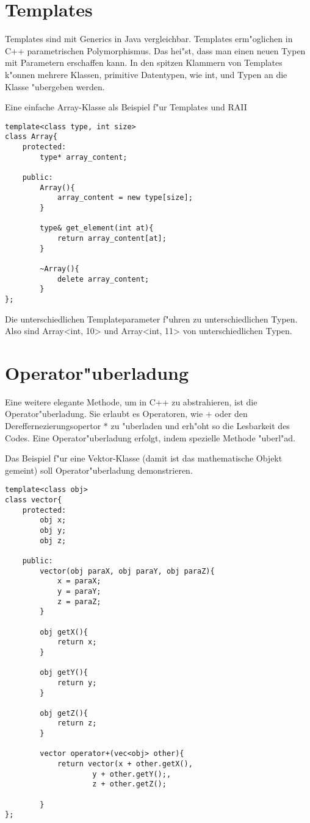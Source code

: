 \documentclass[14pt, a4paper]{report}
\begin{document}
\section{Templates}
Templates sind mit Generics in Java vergleichbar. Templates erm"oglichen in C++
parametrischen Polymorphismus. Das hei"st, dass man einen neuen Typen mit Parametern
erschaffen kann. In den spitzen Klammern von Templates k"onnen mehrere Klassen, 
primitive Datentypen, wie int, und Typen an die Klasse "ubergeben werden.

Eine einfache Array-Klasse als Beispiel f"ur Templates und RAII
\begin{lstlisting}
template<class type, int size>
class Array{
	protected:
		type* array_content;

	public:
		Array(){
			array_content = new type[size];
		}

		type& get_element(int at){
			return array_content[at];
		}

		~Array(){
			delete array_content;
		}
}; 
\end{lstlisting}

Die unterschiedlichen Templateparameter f"uhren zu unterschiedlichen Typen. Also sind 
Array<int, 10> und Array<int, 11> von unterschiedlichen Typen.

\section{Operator"uberladung}
Eine weitere elegante Methode, um in C++ zu abstrahieren, ist die Operator"uberladung.
Sie erlaubt es Operatoren, wie $+$ oder den Dereffernezierungsopertor $*$ zu "uberladen
und erh"oht so die Lesbarkeit des Codes. Eine Operator"uberladung erfolgt, indem
spezielle Methode "uberl"ad.

Das Beispiel f"ur eine Vektor-Klasse (damit ist das mathematische Objekt gemeint) soll
Operator"uberladung demonstrieren.

\begin{lstlisting}
template<class obj>
class vector{
	protected:
		obj x;
		obj y;
		obj z;

	public:
		vector(obj paraX, obj paraY, obj paraZ){
			x = paraX;
			y = paraY;
			z = paraZ;
		}

		obj getX(){
			return x;
		}

		obj getY(){
			return y;
		}
		
		obj getZ(){
			return z;
		}
		
		vector operator+(vec<obj> other){
			return vector(x + other.getX(), 
					y + other.getY();, 
					z + other.getZ(); 

		}
};
\end{lstlisting}
\end{document}
